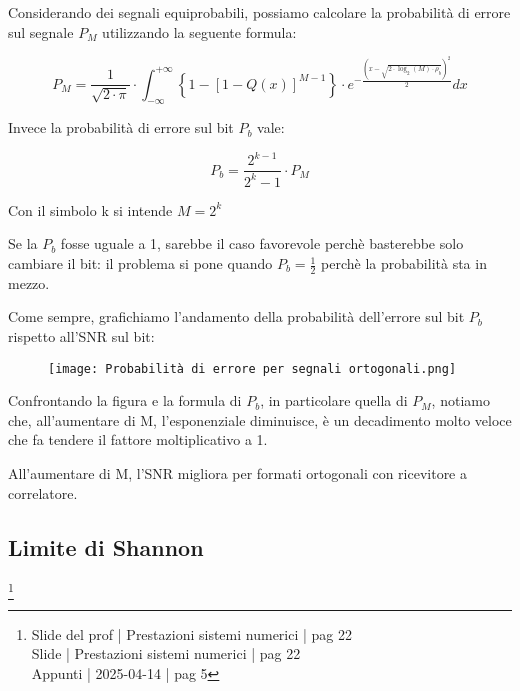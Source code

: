 Considerando dei segnali equiprobabili, 
possiamo calcolare la probabilità di errore sul segnale $P_M$ utilizzando la seguente formula: 

{
    \Large 
    \begin{equation}
        P_M 
        = 
        \frac{1}{\sqrt{2 \cdot \pi}}
        \cdot 
        \int_{- \infty}^{+ \infty}
        \left\{
            1 - 
            \left[
                1 - Q(x)
            \right]^{M-1}
        \right\}
        \cdot 
        e^{- \frac{(x - \sqrt{2 \cdot \log_{2} (M) \cdot \rho_b})^{2} }{2}}
        dx
    \end{equation}
}

Invece la probabilità di errore sul bit $P_b$ vale: 

{
    \Large 
    \begin{equation}
        P_b 
        =
        \frac{2^{k - 1}}{2^{k} - 1} \cdot P_M
    \end{equation}
}

\begin{tcolorbox}

Con il simbolo k si intende $M = 2^{k}$ 

\end{tcolorbox}

Se la $P_b$ fosse uguale a 1, sarebbe il caso favorevole perchè basterebbe solo cambiare il bit: 
il problema si pone quando $P_b = \frac{1}{2}$ perchè la probabilità sta in mezzo. \newline 

Come sempre, grafichiamo l'andamento della probabilità dell'errore sul bit $P_b$ rispetto all'SNR sul bit: 

\begin{figure}[h]
    \centering
    \texttt{[image: Probabilità di errore per segnali ortogonali.png]}
\end{figure}

Confrontando la figura e la formula di $P_b$, in particolare quella di $P_M$, 
notiamo che, 
all'aumentare di M, 
l'esponenziale diminuisce, 
è un decadimento molto veloce che fa tendere il fattore moltiplicativo a 1. \newline 

All'aumentare di M, l'SNR migliora per formati ortogonali con ricevitore a correlatore. \newline 

\newpage 

\subsection{Limite di Shannon}
\footnote{Slide del prof | Prestazioni sistemi numerici | pag 22 \\
Slide | Prestazioni sistemi numerici | pag 22 \\
Appunti | 2025-04-14 | pag 5
}

